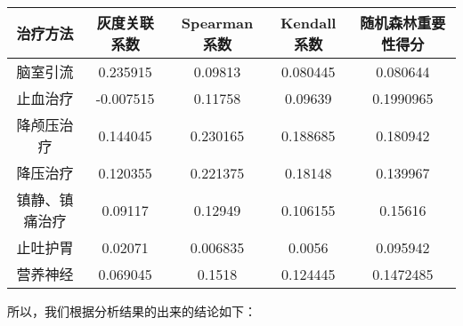 \documentclass[bwprint]{gmcmthesis}
\begin{document}
				\begin{table}[H]
					\centering
					\begin{tabular}{|c|c|c|c|c|}
						\hline
						\rowcolor{green!30} 治疗方法 & 灰度关联系数 & Spearman系数 & Kendall系数 & 随机森林重要性得分 \\ \hline
						\rowcolor{green!5}脑室引流 & 0.235915 & 0.09813 & 0.080445 & 0.080644 \\ \hline
						\rowcolor{white!5}止血治疗 & -0.007515 & 0.11758 & 0.09639 & 0.1990965 \\ \hline
						\rowcolor{green!5}降颅压治疗 & 0.144045 & 0.230165 & 0.188685 & 0.180942 \\ \hline
						\rowcolor{white!5}降压治疗 & 0.120355 & 0.221375 & 0.18148 & 0.139967  \\ \hline
						\rowcolor{green!5}镇静、镇痛治疗 & 0.09117 & 0.12949 & 0.106155 & 0.15616 \\ \hline
						\rowcolor{white!5}止吐护胃 & 0.02071 & 0.006835 & 0.0056 & 0.095942 \\ \hline
						\rowcolor{green!5}营养神经 & 0.069045 & 0.1518 & 0.124445 & 0.1472485 \\ \hline
					\end{tabular}
				\end{table}
				
				所以，我们根据分析结果的出来的结论如下：
				
\end{document}
